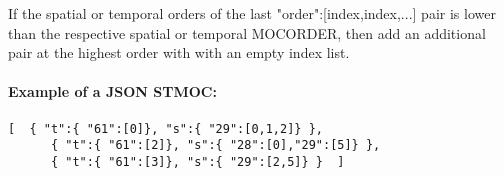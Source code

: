 If the spatial or temporal orders of the last "order":[index,index,...] pair is lower than the respective spatial or temporal MOCORDER, then add an additional pair at the highest order with with an empty index list.

\paragraph{Example of a JSON STMOC:}
\par\noindent
\begin{Verbatim}[frame=single]
   [  { "t":{ "61":[0]}, "s":{ "29":[0,1,2]} },
      { "t":{ "61":[2]}, "s":{ "28":[0],"29":[5]} },
      { "t":{ "61":[3]}, "s":{ "29":[2,5]} }  ]
\end{Verbatim}

